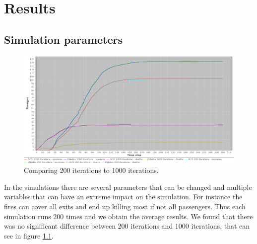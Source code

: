 \chapter{Results}
\label{ch:testing}

\section{Simulation parameters}

\begin{figure} [h]
\centering
\hspace*{-1.0in}
\includegraphics[scale=0.35]{images/Graph-using-200-rounds-and-1000-rounds.png}
\caption{Comparing 200 iterations to 1000 iterations.}
\label{fig:celeb1000}
\end{figure}

In the simulations there are several parameters that can be changed and multiple variables that can have an extreme impact on the simulation. For instance the fires can cover all exits and end up killing most if not all passengers. Thus each simulation runs 200 times and we obtain the average results. We found that there was no significant difference between 200 iterations and 1000 iterations, that can see in figure \ref{fig:celeb1000}.

